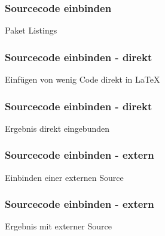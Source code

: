 \begin{frame}
    \frametitle{Sourcecode einbinden}
    \begin{block}{Paket Listings}
        
    \end{block}
\end{frame}
\begin{frame}
    \frametitle{Sourcecode einbinden - direkt}
    \begin{block}{Einfügen von wenig Code direkt in \LaTeX}
        
    \end{block}
\end{frame}
\begin{frame}
    \frametitle{Sourcecode einbinden - direkt}
    \begin{block}{Ergebnis direkt eingebunden}
        
    \end{block}
\end{frame}
\begin{frame}
    \frametitle{Sourcecode einbinden - extern}
    \begin{block}{Einbinden einer externen Source}
        
    \end{block}
\end{frame}
\begin{frame}
    \frametitle{Sourcecode einbinden - extern}
    \begin{block}{Ergebnis mit externer Source}
        
    \end{block}
\end{frame}
